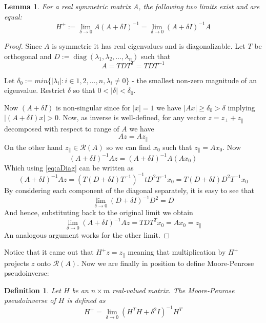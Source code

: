 \documentclass[a4paper]{article}
\theoremstyle{break}
\newtheorem{definition}{Definition}[section]
\newtheorem{lemma}[theorem]{Lemma}
\newcommand{\Ra}{\mathcal{R}}
\DeclareMathOperator{\diag}{diag}
\newcommand{\pll}{\parallel}
\begin{document}
\begin{lemma}\label{lem:limit_existence_1}
    For a real symmetric matrix A, the following two limits exist and are equal:
    \begin{equation}
        H^+ := \lim_{\delta \to 0} A ( A + \delta I) ^{-1}
            = \lim_{\delta \to 0} ( A + \delta I) ^{-1} A
    \end{equation}
\end{lemma}

\begin{proof}
    Since $A$ is symmetric it has real eigenvalues and is diagonalizable.
    Let $T$ be orthogonal and $D := \diag (\lambda_1, \lambda_2, \ldots, \lambda_n)$ such that
    \begin{equation}
    \label{eq:aDiag}
        A = T D T^T = T D T^{-1}
    \end{equation}
    
    Let $ \delta_0 := min\{ | \lambda_i | : i \in {1, 2, \ldots, n}, \lambda_i \neq 0 \}$ - the smallest non-zero magnitude of an eigenvalue.
    Restrict $ \delta$ so that $ 0 <  | \delta | < \delta_0$.
    
    Now $(A + \delta I)$ is non-singular since for $ | x | = 1$ we have $ | A x | \geq \delta_0 > \delta$
    implying $ | (A + \delta I) x | > 0 $.
    Now, as inverse is well-defined, for any vector $z = z_\perp + z_\pll$ decomposed with respect to range of $A$ we have
    $$ A z = A z_\pll$$
    On the other hand $z_\pll \in \Ra(A)$ so we can find $x_0$ such that $ z_\pll = A x_0$. Now
    $$ (A + \delta I)^{-1} A z = (A + \delta I)^{-1} A (A x_0) $$
    Which using \eqref{eq:aDiag} can be written as
    $$ (A + \delta I)^{-1} A z =
    (T(D + \delta I) T^{-1})^{-1} t D^2 T^{-1} x_0 =
    T (D + \delta I) D^2 T^{-1} x_0
    $$
    By considering each component of the diagonal separately, it is easy to see that
    $$ \lim_{\delta \to 0} (D + \delta I)^{-1} D^2 = D $$
    And hence, substituting back to the original limit we obtain
    $$ \lim_{\delta \to 0} ( A + \delta I) ^{-1} A z = T D T^T x_0 = A x_0 = z_\pll $$
    An analogous argument works for the other limit.
\end{proof}

Notice that it came out that $ H^+ z = z_\pll$ meaning that multiplication by $H^+$ projects $z$ onto $\Ra(A)$. Now we are finally in position to define Moore-Penrose pseudoinverse:

\begin{definition}
    Let $H$ be an $ n \times m $ real-valued matrix.
    The Moore-Penrose pseudoinverse of $H$ is defined as
    $$ H^+ = \lim_{\delta \to 0} ( H^T H + \delta^2 I) ^{-1} H^T $$
\end{definition}
\end{document}
